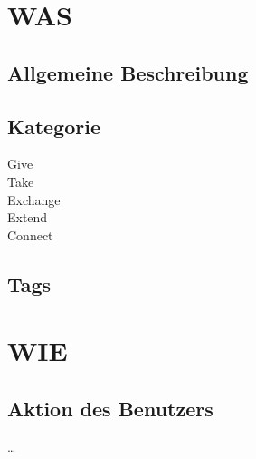 \maketitle


\section*{WAS}

\subsection*{Allgemeine Beschreibung}
\desc

\subsection*{Kategorie}
 Give \\
 Take \\
 Exchange \\
 Extend \\
 Connect

\subsection*{Tags}

\tags

\section*{WIE}

\subsection*{Aktion des Benutzers}
\dots